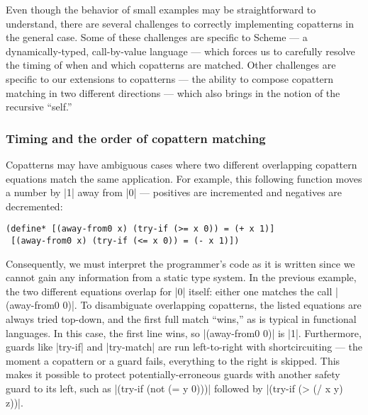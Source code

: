 Even though the behavior of small examples may be straightforward to understand, there are several challenges to correctly implementing copatterns in the general case.
Some of these challenges are specific to Scheme --- a dynamically-typed, call-by-value language --- which forces us to carefully resolve the timing of when and which copatterns are matched.
Other challenges are specific to our extensions to copatterns --- the ability to compose copattern matching in two different directions --- which also brings in the notion of the recursive ``self.''

\subsubsection{Timing and the order of copattern matching}
\label{sec:timing-challenges}

Copatterns may have ambiguous cases where two different overlapping copattern equations match the same application.
For example, this following function moves a number by \scm|1| away from \scm|0| --- positives are incremented and negatives are decremented:
\begin{lstlisting}[language=Scm]
(define* [(away-from0 x) (try-if (>= x 0)) = (+ x 1)]
 [(away-from0 x) (try-if (<= x 0)) = (- x 1)])
\end{lstlisting}
Consequently, we must interpret the programmer's code as it is written since we cannot gain any information from a static type system.
In the previous example, the two different equations overlap for \scm|0| itself: either one matches the call \scm|(away-from0 0)|.
To disambiguate overlapping copatterns, the listed equations are always tried top-down, and the first full match ``wins,'' as is typical in functional languages.
In this case, the first line wins, so \scm|(away-from0 0)| is \scm|1|.
Furthermore, guards like \scm|try-if| and \scm|try-match| are run left-to-right with shortcircuiting --- the moment a copattern or a guard fails, everything to the right is skipped.
This makes it possible to protect potentially-erroneous guards with another safety guard to its left, such as \scm|(try-if (not (= y 0)))| followed by \scm|(try-if (> (/ x y) z))|.


